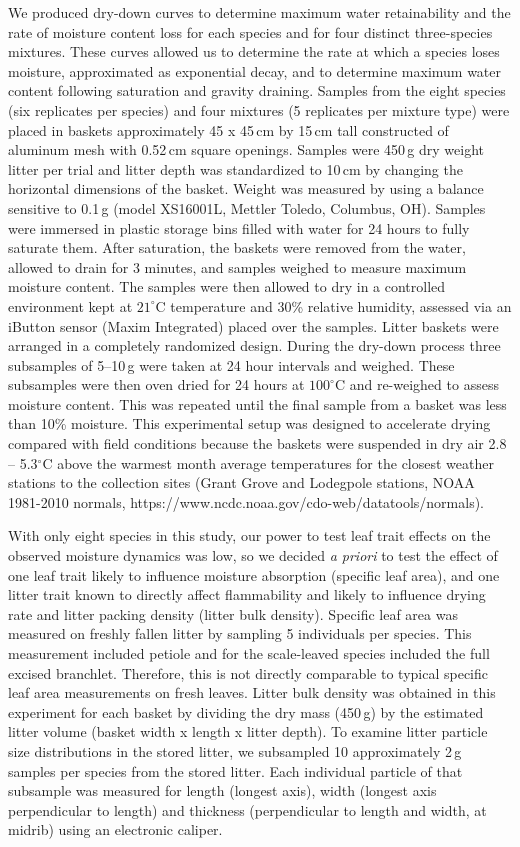 \documentclass[letterpaper,12pt]{article}
\begin{document}
We produced dry-down curves to determine maximum water retainability and the
rate of moisture content loss for each species and for four distinct
three-species mixtures. These curves allowed us to determine the rate at which
a species loses moisture, approximated as exponential decay, and to determine
maximum water content following saturation and gravity draining. Samples from
the eight species (six replicates per species) and four mixtures (5 replicates
per mixture type) were placed in baskets approximately 45 x 45\,cm by 15\,cm
tall constructed of aluminum mesh with 0.52\,cm square openings. Samples were
450\,g dry weight litter per trial and litter depth was standardized to 10\,cm
by changing the horizontal dimensions of the basket. Weight was measured by
using a balance sensitive to 0.1\,g (model XS16001L, Mettler Toledo, Columbus,
OH). Samples were immersed in plastic storage bins filled with water for 24
hours to fully saturate them. After saturation, the baskets were removed from
the water, allowed to drain for 3 minutes, and samples weighed to measure
maximum moisture content. The samples were then allowed to dry in a controlled
environment kept at $21^\circ$C temperature and 30\% relative humidity,
assessed via an iButton sensor (Maxim Integrated) placed over the samples.
Litter baskets were arranged in a completely randomized design. During the
dry-down process three subsamples of 5--10\,g were taken at 24 hour intervals
and weighed. These subsamples were then oven dried for 24 hours at $100^\circ$C
and re-weighed to assess moisture content. This was repeated until the final
sample from a basket was less than 10\% moisture. This experimental setup was designed to accelerate drying compared with field conditions because the baskets were suspended in dry air 2.8 -- 5.3$^\circ$C above the warmest month average temperatures for the closest weather stations to the collection sites (Grant Grove and Lodegpole stations, NOAA 1981-2010 normals, https://www.ncdc.noaa.gov/cdo-web/datatools/normals).


With only eight species in this study, our power to test leaf trait effects on
the observed moisture dynamics was low, so we decided \emph{a priori} to test
the effect of one leaf trait likely to influence moisture absorption (specific
leaf area), and one litter trait known to directly affect flammability and
likely to influence drying rate and litter packing density (litter bulk
density). Specific leaf area was measured on freshly fallen litter
by sampling 5 individuals per species. This measurement included petiole and
for the scale-leaved species included the full excised branchlet. Therefore,
this is not directly comparable to typical specific leaf area measurements on
fresh leaves. Litter bulk density was obtained in this experiment for each
basket by dividing the dry mass (450\,g) by the estimated litter volume (basket
width x length x litter depth). To examine litter particle size distributions in the stored litter, we subsampled 10 approximately 2\,g samples per species from the stored litter. Each individual particle of that subsample was measured for length (longest axis), width (longest axis perpendicular to length) and thickness (perpendicular to length and width, at midrib) using an electronic caliper.
\end{document}
